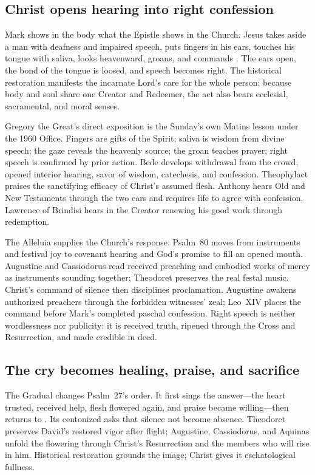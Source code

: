 \subsection*{Christ opens hearing into right confession}

Mark shows in the body what the Epistle shows in the Church. Jesus takes aside
a man with deafness and impaired speech, puts fingers in his ears, touches his
tongue with saliva, looks heavenward, groans, and commands .
The ears open, the bond of the tongue is loosed, and speech becomes right. The
historical restoration manifests the incarnate Lord's care for the whole
person; because body and soul share one Creator and Redeemer, the act also bears
ecclesial, sacramental, and moral senses.

Gregory the Great's direct exposition is the Sunday's own Matins lesson under
the 1960 Office. Fingers are gifts of the Spirit; saliva is wisdom from divine
speech; the gaze reveals the heavenly source; the groan teaches prayer; right
speech is confirmed by prior action. Bede develops withdrawal from the crowd,
opened interior hearing, savor of wisdom, catechesis, and confession.
Theophylact praises the sanctifying efficacy of Christ's assumed flesh. Anthony
hears Old and New Testaments through the two ears and requires life to agree
with confession. Lawrence of Brindisi hears in  the
Creator renewing his good work through redemption.

The Alleluia supplies the Church's response. Psalm~80 moves from instruments
and festival joy to covenant hearing and God's promise to fill an opened mouth.
Augustine and Cassiodorus read received preaching and embodied works of mercy
as instruments sounding together; Theodoret preserves the real festal music.
Christ's command of silence then disciplines proclamation. Augustine awakens
authorized preachers through the forbidden witnesses' zeal; Leo~XIV places the
command before Mark's completed paschal confession. Right speech is neither
wordlessness nor publicity: it is received truth, ripened through the Cross and
Resurrection, and made credible in deed.

\subsection*{The cry becomes healing, praise, and sacrifice}

The Gradual changes Psalm~27's order. It first sings the answer---the heart
trusted, received help, flesh flowered again, and praise became willing---then
returns to . Its centonized
 asks that silence not become absence. Theodoret
preserves David's restored vigor after flight; Augustine, Cassiodorus, and
Aquinas unfold the flowering through Christ's Resurrection and the members
who will rise in him. Historical restoration grounds the image; Christ gives
it eschatological fullness.

